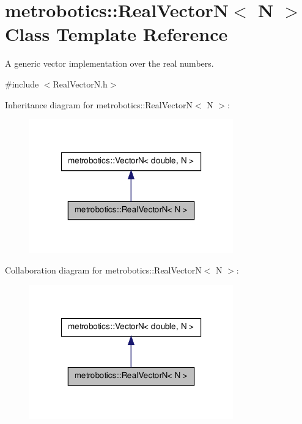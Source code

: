\hypertarget{classmetrobotics_1_1RealVectorN}{\section{metrobotics\-:\-:\-Real\-Vector\-N$<$ \-N $>$ \-Class \-Template \-Reference}
\label{classmetrobotics_1_1RealVectorN}
}


\-A generic vector implementation over the real numbers.  




{\ttfamily \#include $<$\-Real\-Vector\-N.\-h$>$}



\-Inheritance diagram for metrobotics\-:\-:\-Real\-Vector\-N$<$ \-N $>$\-:
\nopagebreak
\begin{figure}[H]
\begin{center}
\leavevmode
\includegraphics[width=250pt]{classmetrobotics_1_1RealVectorN__inherit__graph}
\end{center}
\end{figure}


\-Collaboration diagram for metrobotics\-:\-:\-Real\-Vector\-N$<$ \-N $>$\-:
\nopagebreak
\begin{figure}[H]
\begin{center}
\leavevmode
\includegraphics[width=250pt]{classmetrobotics_1_1RealVectorN__coll__graph}
\end{center}
\end{figure}
